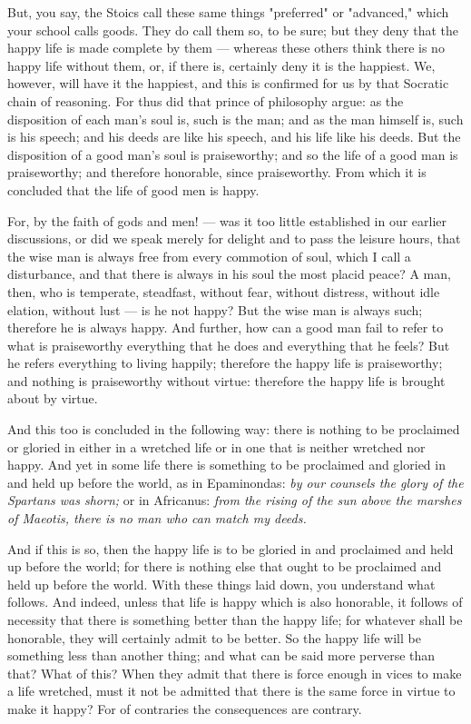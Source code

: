  But, you say, the Stoics call these same things "preferred" or "advanced," which your school calls goods. They do call them so, to be sure; but they deny that the happy life is made complete by them — whereas these others think there is no happy life without them, or, if there is, certainly deny it is the happiest. We, however, will have it the happiest, and this is confirmed for us by that Socratic chain of reasoning. For thus did that prince of philosophy argue: as the disposition of each man's soul is, such is the man; and as the man himself is, such is his speech; and his deeds are like his speech, and his life like his deeds. But the disposition of a good man's soul is praiseworthy; and so the life of a good man is praiseworthy; and therefore honorable, since praiseworthy. From which it is concluded that the life of good men is happy.

 For, by the faith of gods and men! — was it too little established in our earlier discussions, or did we speak merely for delight and to pass the leisure hours, that the wise man is always free from every commotion of soul, which I call a disturbance, and that there is always in his soul the most placid peace? A man, then, who is temperate, steadfast, without fear, without distress, without idle elation, without lust — is he not happy? But the wise man is always such; therefore he is always happy. And further, how can a good man fail to refer to what is praiseworthy everything that he does and everything that he feels? But he refers everything to living happily; therefore the happy life is praiseworthy; and nothing is praiseworthy without virtue: therefore the happy life is brought about by virtue.

 And this too is concluded in the following way: there is nothing to be proclaimed or gloried in either in a wretched life or in one that is neither wretched nor happy. And yet in some life there is something to be proclaimed and gloried in and held up before the world, as in Epaminondas: \textit{by our counsels the glory of the Spartans was shorn;} or in Africanus: \textit{from the rising of the sun above the marshes of Maeotis, there is no man who can match my deeds.}

 And if this is so, then the happy life is to be gloried in and proclaimed and held up before the world; for there is nothing else that ought to be proclaimed and held up before the world. With these things laid down, you understand what follows. And indeed, unless that life is happy which is also honorable, it follows of necessity that there is something better than the happy life; for whatever shall be honorable, they will certainly admit to be better. So the happy life will be something less than another thing; and what can be said more perverse than that? What of this? When they admit that there is force enough in vices to make a life wretched, must it not be admitted that there is the same force in virtue to make it happy? For of contraries the consequences are contrary.

